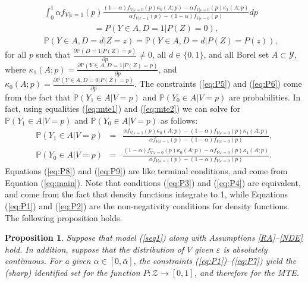 \documentclass[11pt,reqno]{amsart}
\theoremstyle{plain}
\newtheorem{proposition}{Proposition}
\numberwithin{equation}{section}
\begin{document}
\begin{eqnarray}
&&\int^1_0 \alpha f_{V\vert \varepsilon=1}(p) \frac{\left(1-\alpha \right) f_{V\vert \varepsilon=0}(p)\kappa_0(A;p)-\alpha f_{V\vert \varepsilon=0}(p)\kappa_1(A;p)}{\alpha f_{V\vert \varepsilon=1}(p)-\left(1-\alpha\right)f_{V\vert \varepsilon=0}(p)} dp\nonumber\\
&& \qquad \qquad \qquad \mathbb = P(Y\in A, D=1\vert P(Z)=0), \label{eq:P9}\\
&&\mathbb P\left(Y\in A, D=d\vert Z=z\right) = \mathbb P\left(Y\in A, D=d\vert P(Z)=P(z)\right), \label{eq:P7}
\end{eqnarray}
for all $p$ such that $\frac{\partial \mathbb P(D=1 \vert P(Z)=p) }{\partial p}\neq 0$, all $d\in\{0,1\}$, and all Borel set $A \subset \mathcal Y$, where $\kappa_1(A;p)=\frac{\partial \mathbb P(Y\in A, D=1 \vert P(Z)=p) }{\partial p}$, and $\kappa_0(A;p)=\frac{\partial \mathbb P(Y\in A, D=0 \vert P(Z)=p) }{\partial p}$. The constraints (\ref{eq:P5}) and (\ref{eq:P6}) come from the fact that $\mathbb P\left(Y_1\in A \vert V=p\right)$ and $\mathbb P\left(Y_0\in A \vert V=p\right)$ are probabilities. In fact, using equalities (\ref{eq:mte1}) and (\ref{eq:mte2})
we can solve for $\mathbb P\left(Y_1\in A \vert V=p\right)$ and $\mathbb P\left(Y_0\in A \vert V=p\right)$ as follows:
\begin{eqnarray*}
\mathbb P\left(Y_1\in A \vert V=p\right) &=&\frac{\alpha f_{V\vert \varepsilon=1}(p)\kappa_0(A;p)-\left(1-\alpha\right)f_{V\vert \varepsilon=0}(p)\kappa_1(A;p)}{\alpha f_{V\vert \varepsilon=1}(p)-\left(1-\alpha\right)f_{V\vert \varepsilon=0}(p)} ,\\
\mathbb P\left(Y_0\in A \vert V=p\right) &=& \frac{\left(1-\alpha \right) f_{V\vert \varepsilon=0}(p)\kappa_0(A;p)-\alpha f_{V\vert \varepsilon=0}(p)\kappa_1(A;p)}{\alpha f_{V\vert \varepsilon=1}(p)-\left(1-\alpha\right)f_{V\vert \varepsilon=0}(p)}.
\end{eqnarray*}
Equations (\ref{eq:P8}) and (\ref{eq:P9}) are like terminal conditions, and come from Equation (\ref{eq:main}).
Note that conditions (\ref{eq:P3}) and (\ref{eq:P4}) are equivalent, and come from the fact that density functions integrate to 1, while Equations (\ref{eq:P1}) and (\ref{eq:P2}) are the non-negativity conditions for density functions. 
The following proposition holds.
\begin{proposition}\label{prop:sharp}
Suppose that model (\ref{seq1}) along with Assumptions \ref{RA}--\ref{NDE} hold. In addition, suppose that the distribution of $V$ given $\varepsilon$ is absolutely continuous. For a given $\alpha \in [0,\bar{\alpha}]$, the constraints (\ref{eq:P1})--(\ref{eq:P7}) yield the (sharp) identified set for the function $P: \mathcal Z \rightarrow [0,1]$, and therefore for the MTE.
\end{proposition}
\end{document}
